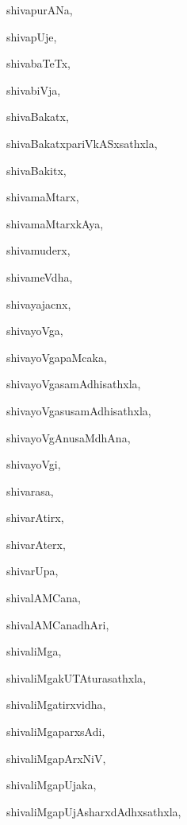 \begin{multicols}{2}
{shivapurANa}, \pageref{shivapurANa}

{shivapUje}, \pageref{shivapUje}

{shivabaTeTx}, \pageref{shivabaTeTx}

{shivabiVja}, \pageref{shivabiVja}

{shivaBakatx}, \pageref{shivaBakatx}

{shivaBakatxpariVkASxsathxla}, \pageref{shivaBakatxpariVkASxsathxla}

{shivaBakitx}, \pageref{shivaBakitx}

{shivamaMtarx}, \pageref{shivamaMtarx}

{shivamaMtarxkAya}, \pageref{shivamaMtarxkAya}

{shivamuderx}, \pageref{shivamuderx}

{shivameVdha}, \pageref{shivameVdha}

{shivayajacnx}, \pageref{shivayajacnx}

{shivayoVga}, \pageref{shivayoVga}

{shivayoVgapaMcaka}, \pageref{shivayoVgapaMcaka}

{shivayoVgasamAdhisathxla}, \pageref{shivayoVgasamAdhisathxla}

{shivayoVgasusamAdhisathxla}, \pageref{shivayoVgasusamAdhisathxla}

{shivayoVgAnusaMdhAna}, \pageref{shivayoVgAnusaMdhAna}

{shivayoVgi}, \pageref{shivayoVgi}

{shivarasa}, \pageref{shivarasa}

{shivarAtirx}, \pageref{shivarAtirx}

{shivarAterx}, \pageref{shivarAterx}

{shivarUpa}, \pageref{shivarUpa}

{shivalAMCana}, \pageref{shivalAMCana}

{shivalAMCanadhAri}, \pageref{shivalAMCanadhAri}

{shivaliMga}, \pageref{shivaliMga}

{shivaliMgakUTAturasathxla}, \pageref{shivaliMgakUTAturasathxla}

{shivaliMgatirxvidha}, \pageref{shivaliMgatirxvidha}

{shivaliMgaparxsAdi}, \pageref{shivaliMgaparxsAdi}

{shivaliMgapArxNiV}, \pageref{shivaliMgapArxNiV}

{shivaliMgapUjaka}, \pageref{shivaliMgapUjaka}

{shivaliMgapUjAsharxdAdhxsathxla}, \pageref{shivaliMgapUjAsharxdAdhxsathxla}


\end{multicols}

